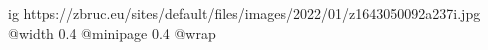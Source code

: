  
 
 
 
 

\ifcmt
  ig https://zbruc.eu/sites/default/files/images/2022/01/z1643050092a237i.jpg
  @width 0.4
  @minipage 0.4
  @wrap \parpic[r]
\fi
